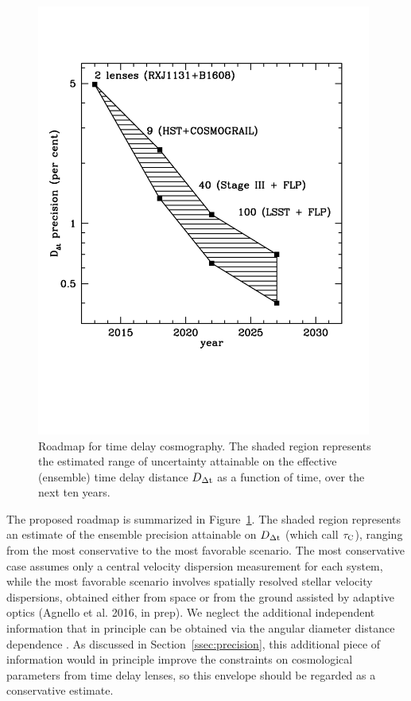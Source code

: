 \begin{figure}
\includegraphics[width=0.98\textwidth]{figures/roadmap.pdf}
\caption{Roadmap for time delay cosmography. The shaded region
represents the estimated range of uncertainty attainable on the
effective (ensemble) time delay distance $D_{\Delta{\rm t}}$ as a
function of time, over the next ten years.}
\label{fig:roadmap}
\end{figure}

The proposed roadmap is summarized in Figure~\ref{fig:roadmap}. The
shaded region represents an estimate of the ensemble precision attainable on
$D_{\Delta{\rm t}}$ (which \citet{C+M09b} call $\mathcal{\tau}_{\rm C}$),
ranging from the most conservative to the most favorable
scenario. The most conservative case assumes only a central velocity
dispersion measurement for each system, while the most favorable
scenario involves spatially resolved stellar velocity dispersions,
obtained either from space or from the ground assisted by adaptive optics
(Agnello et al. 2016, in prep). We neglect the additional independent
information that in principle can be obtained via the angular
diameter distance dependence \citep{JeeEtal2016}.  As
discussed in Section~\ref{ssec:precision}, this additional piece of
information would in principle improve the constraints on cosmological
parameters from time delay lenses, so this envelope should be regarded
as a conservative estimate.

